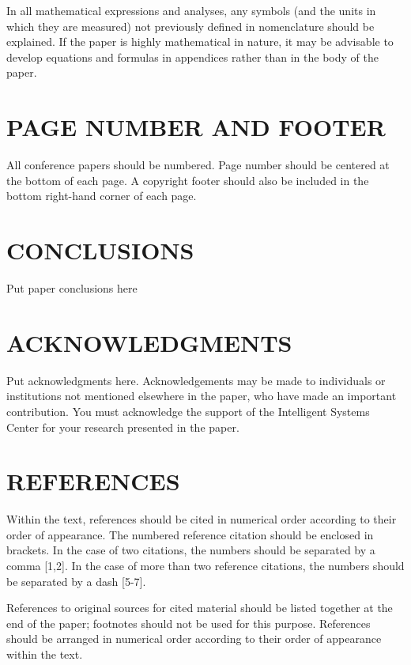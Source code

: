 \documentclass{ISCGRS}
\begin{document}
In all mathematical expressions and analyses, any symbols (and the units in which they are measured) not previously defined in nomenclature should be explained. If the paper is highly mathematical in nature, it may be advisable to develop equations and formulas in appendices rather than in the body of the paper.

\section{PAGE NUMBER AND FOOTER}
All conference papers should be numbered. Page number should be centered at the bottom of each page. A copyright footer should also be included in the bottom right-hand corner of each page.

\section{CONCLUSIONS}
Put paper conclusions here

\section{ACKNOWLEDGMENTS}
Put acknowledgments here. Acknowledgements may be made to individuals or institutions not mentioned elsewhere in the paper, who have made an important contribution. You must acknowledge the support of the Intelligent Systems Center for your research presented in the paper.

\section{REFERENCES}
Within the text, references should be cited in numerical order according to their order of appearance. The numbered reference citation should be enclosed in brackets. In the case of two citations, the numbers should be separated by a comma [1,2]. In the case of more than two reference citations, the numbers should be separated by a dash [5-7].

References to original sources for cited material should be listed together at the end of the paper; footnotes should not be used for this purpose. References should be arranged in numerical order according to their order of appearance within the text.

\end{document}
